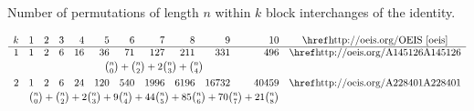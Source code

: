     \begin{table}[t]
    \caption{Number of permutations of length $n$ within $k$ block interchanges of the
    identity.}
    \begin{footnotesize}
    $$
    \begin{array}{rrrrrrrrrrrc}
    k &1&2&3&4&5&6&7&8&9&10&\text{\OEISref}\\\hline
    1&1&2&6&16&36&71&127&211&331&496&\text{\OEISlink{A145126}}\\[0.5ex]
    &\multicolumn{10}{c}{{n\choose 0}+{n\choose 2}+2{n\choose 3}+{n\choose
    4}}&\\[1ex]
    2&1&2&6&24&120&540&1996&6196&16732&40459&\text{\OEISlink{A228401}}\\[0.5ex]
    &\multicolumn{10}{c}{{n\choose 0}+{n\choose 2}+2{n\choose 3}+9{n\choose
    4}+44{n\choose 5}+85{n\choose 6}+70{n\choose 7}+21{n\choose 8}}&\\
    \end{array}
    $$
    \end{footnotesize}
    \end{table}



